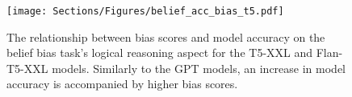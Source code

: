 \begin{figure}[t!] 
\centering
\texttt{[image: Sections/Figures/belief\_acc\_bias\_t5.pdf]}
\caption{The relationship between bias scores and model accuracy on the belief bias task's logical reasoning aspect for the T5-XXL and Flan-T5-XXL models. Similarly to the GPT models, an increase in model accuracy is accompanied by higher bias scores.}
\label{fig:belief_acc_bias_t5}
\end{figure}

